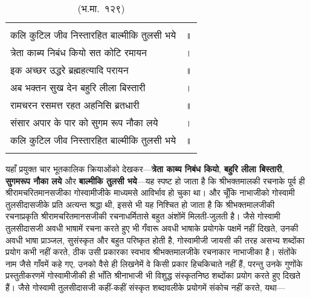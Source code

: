 {\bfseries
\setlength{\mylenone}{0pt}
\settowidth{\mylentwo}{कलि कुटिल जीव निस्तारहित बाल्मीकि तुलसी भये}
\setlength{\mylenone}{\maxof{\mylenone}{\mylentwo}}
\settowidth{\mylentwo}{त्रेता काब्य निबंध कियो सत कोटि रमायन}
\setlength{\mylenone}{\maxof{\mylenone}{\mylentwo}}
\settowidth{\mylentwo}{इक अच्छर उद्धरे ब्रह्महत्यादि परायन}
\setlength{\mylenone}{\maxof{\mylenone}{\mylentwo}}
\settowidth{\mylentwo}{अब भक्तन सुख देन बहुरि लीला बिस्तारी}
\setlength{\mylenone}{\maxof{\mylenone}{\mylentwo}}
\settowidth{\mylentwo}{रामचरन रसमत्त रहत अहनिसि ब्रतधारी}
\setlength{\mylenone}{\maxof{\mylenone}{\mylentwo}}
\settowidth{\mylentwo}{संसार अपार के पार को सुगम रूप नौका लये}
\setlength{\mylenone}{\maxof{\mylenone}{\mylentwo}}
\settowidth{\mylentwo}{कलि कुटिल जीव निस्तारहित बाल्मीकि तुलसी भये}
\setlength{\mylenone}{\maxof{\mylenone}{\mylentwo}}
\setlength{\mylentwo}{\baselineskip}
\setlength{\mylenone}{\mylenone + 1pt}
\begin{longtable}[l]{@{\hspace*{\mylen}}>{\setlength\parfillskip{0pt}}p{\mylenone}@{}@{}l@{}}
 & \\[-\the\mylentwo]
कलि कुटिल जीव निस्तारहित बाल्मीकि तुलसी भये & ॥\\ \nopagebreak
त्रेता काब्य निबंध कियो सत कोटि रमायन & ।\\ \nopagebreak
इक अच्छर उद्धरे ब्रह्महत्यादि परायन & ॥\\
अब भक्तन सुख देन बहुरि लीला बिस्तारी & ।\\ \nopagebreak
रामचरन रसमत्त रहत अहनिसि ब्रतधारी & ॥\\
संसार अपार के पार को सुगम रूप नौका लये & ।\\ \nopagebreak
कलि कुटिल जीव निस्तारहित बाल्मीकि तुलसी भये & ॥\\ \nopagebreak
\caption*{(भ.मा.~१२९)}
\end{longtable}
}

\begin{sloppypar}\justifying{}
यहाँ प्रयुक्त चार भूतकालिक क्रियाओंको देखकर—\textbf{त्रेता काब्य निबंध कियो}, \textbf{बहुरि लीला बिस्तारी}, \textbf{सुगमरूप नौका लये} और \textbf{बाल्मीकि तुलसी भये}—यह स्पष्ट हो जाता है कि श्रीभक्तमालकी रचनाके पूर्व ही श्रीरामचरितमानसजीका गोस्वामीजीके माध्यमसे आविर्भाव हो चुका था। और चूँकि नाभाजीको गोस्वामी तुलसीदासजीके प्रति अत्यन्त श्रद्धा थी, इससे भी यह निश्चित हो जाता है कि श्रीभक्तमालजीकी रचनाप्रकृति श्रीरामचरितमानसजीकी रचनाधर्मितासे बहुत अंशोंमें मिलती-जुलती है। जैसे गोस्वामी तुलसीदासजी अवधी भाषामें रचना करते हुए भी गँवारू अवधी भाषाके प्रयोगके पक्षमें नहीं दिखते, उनकी अवधी भाषा प्राञ्जल, सुसंस्कृत और बहुत परिष्कृत होती है, गोस्वामीजी जायसी की तरह असभ्य शब्दोंका प्रयोग कभी नहीं करते, ठीक उसी प्रकारका स्वभाव श्रीभक्तमालजीके रचनाकार नाभाजीका है। संतोंके नाम जैसे गाँवमें कहे गए, उनको वैसे ही लिखनेमें वे किसी प्रकार हिचकिचाते नहीं हैं, परन्तु उनके गुणोंके प्रस्तुतीकरणमें गोस्वामीजीकी ही भाँति श्रीनाभाजी भी विशुद्ध संस्कृतनिष्ठ शब्दोंका प्रयोग करते हुए दिखते हैं। जैसे गोस्वामी तुलसीदासजी कहीं-कहीं संस्कृत शब्दावलीके प्रयोगमें संकोच नहीं करते, यथा—
\end{sloppypar}

